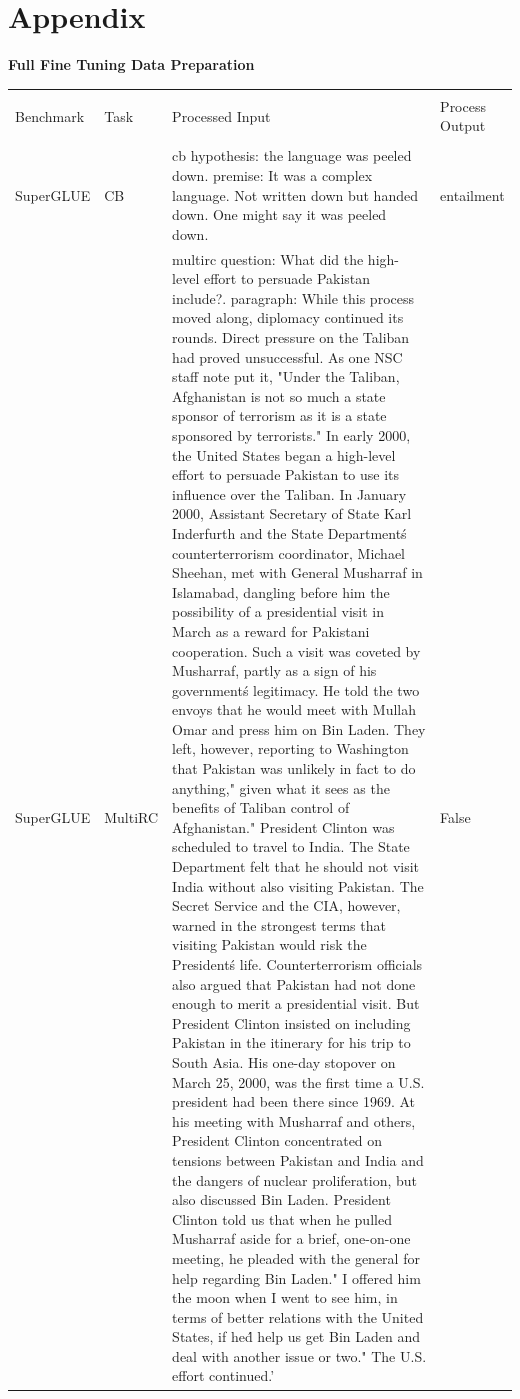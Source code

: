 \documentclass[final,6p,times,twocolumn,authoryear]{elsarticle}
\begin{document}
\newpage
\onecolumn
\section*{Appendix}

\textbf{Full Fine Tuning Data Preparation } \\

\begin{table}[!htbp]
    \centering
    \begin{tabularx}{\textwidth}{l l X l} 
        \\[-1.8ex]\hline 
        \hline \\
        Benchmark & Task & Processed Input & Process Output \\ 
        \hline \\[-1.8ex]
        SuperGLUE & CB & cb hypothesis: the language was peeled down. premise: It was a complex language. Not written down but handed down. One might say it was peeled down. & entailment \\
        SuperGLUE & MultiRC & multirc question: What did the high-level effort to persuade Pakistan include?. paragraph: While this process moved along, diplomacy continued its rounds. Direct pressure on the Taliban had proved unsuccessful. As one NSC staff note put it, "Under the Taliban, Afghanistan is not so much a state sponsor of terrorism as it is a state sponsored by terrorists." In early 2000, the United States began a high-level effort to persuade Pakistan to use its influence over the Taliban. In January 2000, Assistant Secretary of State Karl Inderfurth and the State Department\'s counterterrorism coordinator, Michael Sheehan, met with General Musharraf in Islamabad, dangling before him the possibility of a presidential visit in March as a reward for Pakistani cooperation. Such a visit was coveted by Musharraf, partly as a sign of his government\'s legitimacy. He told the two envoys that he would meet with Mullah Omar and press him on  Bin Laden. They left, however, reporting to Washington that Pakistan was unlikely in fact to do anything," given what it sees as the benefits of Taliban control of Afghanistan." President Clinton was scheduled to travel to India. The State Department felt that he should not visit India without also visiting Pakistan. The Secret Service and the CIA, however, warned in the strongest terms that visiting Pakistan would risk the President\'s life. Counterterrorism officials also argued that Pakistan had not done enough to merit a presidential visit. But President Clinton insisted on including Pakistan in the itinerary for his trip to South Asia. His one-day stopover on March 25, 2000, was the first time a U.S. president had been there since 1969. At his meeting with Musharraf and others, President Clinton concentrated on tensions between Pakistan and India and the dangers of nuclear proliferation, but also discussed  Bin Laden. President Clinton told us that when he pulled Musharraf aside for a brief, one-on-one meeting, he pleaded with the general for help regarding  Bin Laden." I offered him the moon when I went to see him, in terms of better relations with the United States, if he\'d help us get  Bin Laden and deal with another issue or two." The U.S. effort continued.' & False \\

\end{tabularx}
\end{table}
\end{document}
